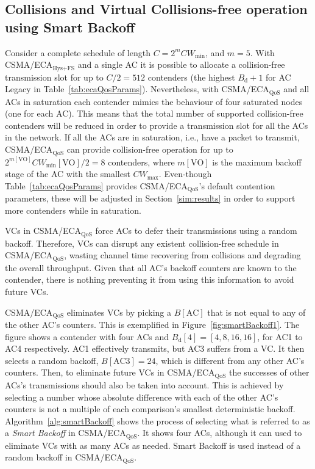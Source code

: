 \subsection{Collisions and Virtual Collisions-free operation using Smart Backoff}\label{ECAqosCollisionFree}
Consider a complete schedule of length $C=2^{m}CW_{\min}$, and $m=5$. With CSMA/ECA$_{\text{Hys+FS}}$ and a single AC it is possible to allocate a collision-free transmission slot for up to $C/2=512$ contenders (the highest $B_{\text{d}}+1$ for AC Legacy in Table~\ref{tab:ecaQosParams}). Nevertheless, with CSMA/ECA$_{\text{QoS}}$ and all ACs in saturation each contender mimics the behaviour of four saturated nodes (one for each AC). This means that the total number of supported collision-free contenders will be reduced in order to provide a transmission slot for all the ACs in the network. If all the ACs are in saturation, i.e., have a packet to transmit, CSMA/ECA$_{\text{QoS}}$ can provide collision-free operation for up to $2^{m[\text{VO}]}CW_{\min}[\text{VO}]/2=8$ contenders, where $m[\text{VO}]$ is the maximum backoff stage of the AC with the smallest $CW_{\max}$. Even-though Table~\ref{tab:ecaQosParams} provides CSMA/ECA$_{\text{QoS}}$'s default contention parameters, these will be adjusted in Section~\ref{sim:results} in order to support more contenders while in saturation.

VCs in CSMA/ECA$_{\text{QoS}}$ force ACs to defer their transmissions using a random backoff. Therefore, VCs can disrupt any existent collision-free schedule in CSMA/ECA$_{\text{QoS}}$, wasting channel time recovering from collisions and degrading the overall throughput. Given that all AC's backoff counters are known to the contender, there is nothing preventing it from using this information to avoid future VCs.

CSMA/ECA$_{\text{QoS}}$ eliminates VCs by picking a $B[\text{AC}]$ that is not equal to any of the other AC's counters. This is exemplified in Figure~\ref{fig:smartBackoff1}. The figure shows a contender with four ACs and $B_{\text{d}}[4]=[4,8,16,16]$, for AC1 to AC4 respectively. AC1 effectively transmits, but AC3 suffers from a VC. It then selects a random backoff, $B[\text{AC3}]=24$, which is different from any other AC's counters. Then, to eliminate future VCs in CSMA/ECA$_{\text{QoS}}$ the successes of other ACs's transmissions should also be taken into account. This is achieved by selecting a number whose absolute difference with each of the other AC's counters is not a multiple of each comparison's smallest deterministic backoff. Algorithm~\ref{alg:smartBackoff} shows the process of selecting what is referred to as a \emph{Smart Backoff} in CSMA/ECA$_{\text{QoS}}$. It shows four ACs, although it can used to eliminate VCs with as many ACs as needed. Smart Backoff is used instead of a random backoff in CSMA/ECA$_{\text{QoS}}$.

